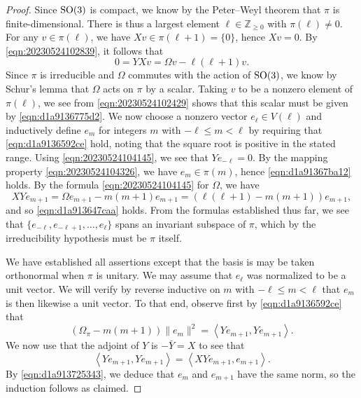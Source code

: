\documentclass[reqno]{amsart} 
\numberwithin{equation}{section}
\numberwithin{theorem}{section}
\begin{document}
\begin{proof}
  Since $\operatorname{SO}(3)$ is compact, we know by the Peter--Weyl theorem that $\pi$ is finite-dimensional.  There is thus a largest element $\ell \in \mathbb{Z}_{\geq 0}$ with $\pi(\ell) \neq 0$.  For any $v \in \pi(\ell)$, we have $X v \in \pi(\ell+1) = \{0\}$, hence $X v = 0$.  By \eqref{eqn:20230524102839}, it follows that
  \begin{equation}\label{eqn:20230524102429}
    0 = Y X v = \Omega v - \ell (\ell + 1) v.
  \end{equation}
  Since $\pi$ is irreducible and $\Omega$ commutes with the action of $\operatorname{SO}(3)$, we know by Schur's lemma that $\Omega$ acts on $\pi$ by a scalar.  Taking $v$ to be a nonzero element of $\pi(\ell)$, we see from \eqref{eqn:20230524102429} shows that this scalar must be given by \eqref{eqn:d1a9136775d2}.  We now choose a nonzero vector $e_{\ell} \in V(\ell)$ and inductively define $e_m$ for integers $m$ with $- \ell \leq m < \ell$ by requiring that \eqref{eqn:d1a9136592ce} hold, noting that the square root is positive in the stated range.  Using \eqref{eqn:20230524104145}, we see that $Y e_{- \ell} = 0$.  By the mapping property \eqref{eqn:20230524104326}, we have $e_m \in \pi(m)$, hence \eqref{eqn:d1a91367ba12} holds.  By the formula \eqref{eqn:20230524104145} for $\Omega$, we have
  \begin{equation*}
    X Y e_{m + 1} = \Omega e_{m+1} - m(m+1) e_{m+1}
    =
    (\ell (\ell + 1) - m (m + 1)) e_{m+1},
  \end{equation*}
  and so \eqref{eqn:d1a913647caa} holds.  From the formulas established thus far, we see that $\{e_{- \ell}, e_{- \ell + 1}, \dotsc, e_{\ell }\}$ spans an invariant subspace of $\pi$, which by the irreducibility hypothesis must be $\pi$ itself.

  We have established all assertions except that the basis is may be taken orthonormal when $\pi$ is unitary.  We may assume that $e_{\ell}$ was normalized to be a unit vector.  We will verify by reverse inductive on $m$ with $- \ell \leq m < \ell$ that $e_m$ is then likewise a unit vector.  To that end, observe first by \eqref{eqn:d1a9136592ce} that
  \begin{equation*}
    (\Omega_\pi - m(m+1))
    \lVert e_{m} \rVert^2
    = \left\langle Y e_{m + 1}, Y e_{m+1} \right\rangle.
  \end{equation*}
  We now use that the adjoint of $Y$ is $- \bar{Y} = X$ to see that
  \begin{equation*}
    \left\langle Y e_{m + 1}, Y e_{m+1} \right\rangle
    =
    \left\langle X Y e_{m + 1}, e_{m+1} \right\rangle.
  \end{equation*}
  By \eqref{eqn:d1a913725343}, we deduce that $e_m$ and $e_{m + 1}$ have the same norm, so the induction follows as claimed.
\end{proof}
\end{document}
